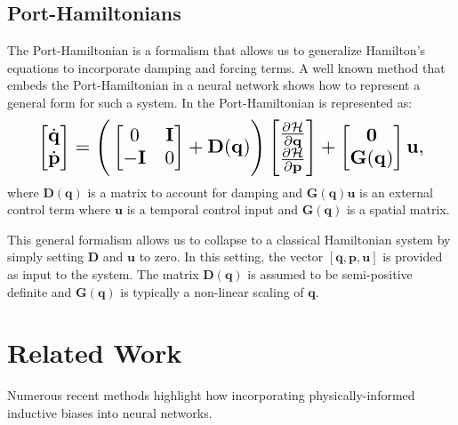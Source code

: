\documentclass[twoside]{article}
\begin{document}
\subsection{Port-Hamiltonians}

The Port-Hamiltonian is a formalism that allows us to generalize Hamilton's equations to incorporate damping and forcing terms. A well known method that embeds the Port-Hamiltonian in a neural network \cite{zhong_dissipative_2020} shows how to represent a general form for such a system. In \cite{zhong_dissipative_2020} the Port-Hamiltonian is represented as:
\begin{equation}
\resizebox{0.9\linewidth}{!}{$%
\begin{bmatrix}
\dot{\mathbf{q}} \\
\dot{\mathbf{p}}
\end{bmatrix}
=
\Bigg(\begin{bmatrix}
0 & \mathbf{I} \\
-\mathbf{I} & 0
\end{bmatrix} +
\mathbf{D}(\mathbf{q})
 \Bigg)
 \begin{bmatrix}
\frac{\partial \mathcal{H}}{\partial \mathbf{q}} \\
\frac{\partial \mathcal{H}}{\partial \mathbf{p}}
\end{bmatrix}
+
\begin{bmatrix}
\mathbf{0} \\
\mathbf{G}(\mathbf{q})
\end{bmatrix}
\mathbf{u},
$%
}%
\label{eqn.pham}
\end{equation}
where $\mathbf{D}(\mathbf{q})$ is a matrix to account for damping and $\mathbf{G}(\mathbf{q})\mathbf{u}$ is an external control term where $\mathbf{u}$ is a temporal control input and $\mathbf{G}(\mathbf{q})$ is a spatial matrix. 

This general formalism allows us to collapse to a classical Hamiltonian system by simply setting $\mathbf{D}$ and $\mathbf{u}$ to zero. In this setting, the vector $[\mathbf{q},\mathbf{p},\mathbf{u}]$ is provided as input to the system. The matrix $\mathbf{D}(\mathbf{q})$ is assumed to be semi-positive definite and $\mathbf{G}(\mathbf{q})$ is typically a non-linear scaling of $\mathbf{q}$.

\section{Related Work}

Numerous recent methods highlight how incorporating physically-informed inductive biases into neural networks.
\end{document}
